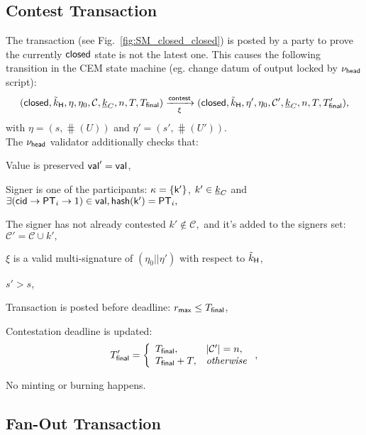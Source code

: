 \subsection{Contest Transaction}\label{sec:contest-tx}



The \mtxContest{} transaction (see
Fig.~\ref{fig:SM_closed_closed}) is posted by a party to prove the currently $\mathsf{closed}$ state is not the latest one. This causes the following transition in the CEM state machine (eg. change datum of output locked by $\nu_\mathsf{head}$ script):
$$
   (\mathsf{closed},\tilde{k}_{\mathsf{H}},\eta,\eta_0,\mathcal{C},\underline{k}_C,n,T,T_{\mathsf{final}}) \xrightarrow[\xi]{\mathsf{contest}} (\mathsf{closed},\tilde{k}_{\mathsf{H}},\eta',\eta_0,\mathcal{C}', \underline{k}_C,n,T,T_{\mathsf{final}}'),
$$
with $\eta = (s, \hash(U))$ and $\eta' = (s', \hash(U')).$ \\

\noindent The $\nu_\mathsf{head}$ validator additionally checks that:
\begin{menumerate}
  \item Value is preserved $\mathsf{val}' = \mathsf{val}$,
  \item Signer is one of the participants: $\kappa = \{\mathsf{k'}\}$, $k' \in \underline{k}_C$ and
    $
    \exists (\mathsf{cid} \rightarrow \mathsf{PT}_i \rightarrow 1) \in \mathsf{val}, \mathsf{hash}(\mathsf{k'}) = \mathsf{PT}_i,
    $
  \item The signer has not already contested $k' \not\in \mathcal{C},$  and it's added to the signers set: $\mathcal{C}' = \mathcal{C} \cup k',$
  \item $\xi$ is a valid multi-signature of $(\eta_0 || \eta')$ with respect to $\tilde{k}_{\mathsf{H}}$, 
  \item $s' > s$, 
  \item Transaction is posted before deadline: $r_{\mathsf{max}} \leq T_{\mathsf{final}}$,
  \item Contestation deadline is updated:
     $$
     T_{\mathsf{final}}' = 
        \left\{\begin{array}{ll}
             T_{\mathsf{final}},     &  |\mathcal{C}'| = n, \\
             T_{\mathsf{final}} + T, &  \mathit{otherwise} \\
        \end{array}\right.,
     $$
  \item No minting or burning happens.
\end{menumerate}


\subsection{Fan-Out Transaction}

